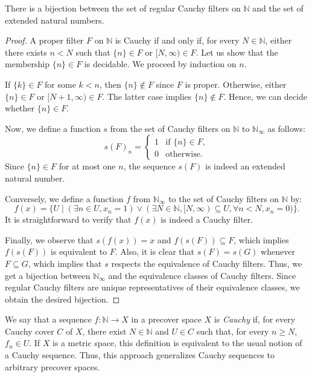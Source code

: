 \documentclass[pdflatex,sn-mathphys-num]{sn-jnl}
\theoremstyle{definition}
\theoremstyle{remark}
\numberwithin{figure}{section}
\begin{document}
\begin{prop}
There is a bijection between the set of regular Cauchy filters on $\mathbb{N}$ and the set of extended natural numbers.
\end{prop}
\begin{proof}
A proper filter $F$ on $\mathbb{N}$ is Cauchy if and only if, for every $N \in \mathbb{N}$, either there exists $n < N$ such that $\{ n \} \in F$ or $[N,\infty) \in F$.
Let us show that the membership $\{ n \} \in F$ is decidable.
We proceed by induction on $n$.

If $\{ k \} \in F$ for some $k < n$, then $\{ n \} \notin F$ since $F$ is proper.
Otherwise, either $\{ n \} \in F$ or $[N + 1, \infty) \in F$.
The latter case implies $\{ n \} \notin F$.
Hence, we can decide whether $\{ n \} \in F$.

Now, we define a function $s$ from the set of Cauchy filters on $\mathbb{N}$ to $\mathbb{N}_\infty$ as follows:
\[ 
s(F)_n = 
\begin{cases} 
1 & \text{if } \{ n \} \in F, \\
0 & \text{otherwise}.
\end{cases}
\]
Since $\{ n \} \in F$ for at most one $n$, the sequence $s(F)$ is indeed an extended natural number.

Conversely, we define a function $f$ from $\mathbb{N}_\infty$ to the set of Cauchy filters on $\mathbb{N}$ by:
\[ f(x) = \{ U \mid (\exists n \in U, x_n = 1) \lor (\exists N \in \mathbb{N}, [N,\infty) \subseteq U, \forall n < N, x_n = 0) \}. \]
It is straightforward to verify that $f(x)$ is indeed a Cauchy filter.

Finally, we observe that $s(f(x)) = x$ and $f(s(F)) \subseteq F$, which implies $f(s(F))$ is equivalent to $F$.
Also, it is clear that $s(F) = s(G)$ whenever $F \subseteq G$, which implies that $s$ respects the equivalence of Cauchy filters.
Thus, we get a bijection between $\mathbb{N}_\infty$ and the equivalence classes of Cauchy filters.
Since regular Cauchy filters are unique representatives of their equivalence classes, we obtain the desired bijection.
\end{proof}

We say that a sequence $f : \mathbb{N} \to X$ in a precover space $X$ is \emph{Cauchy} if, for every Cauchy cover $C$ of $X$, there exist $N \in \mathbb{N}$ and $U \in C$ such that, for every $n \geq N$, $f_n \in U$.
If $X$ is a metric space, this definition is equivalent to the usual notion of a Cauchy sequence.
Thus, this approach generalizes Cauchy sequences to arbitrary precover spaces.
\end{document}

